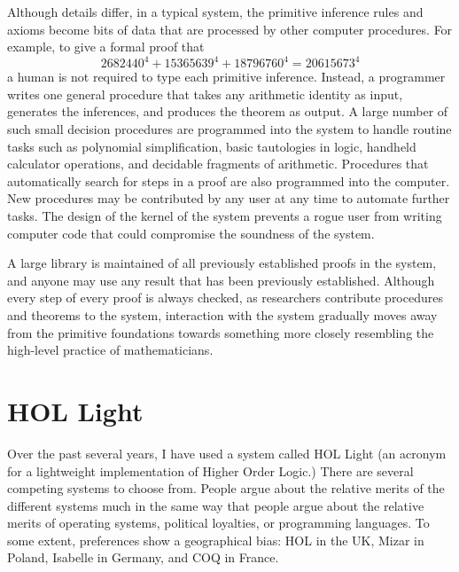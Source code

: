 \documentclass{llncs}
\begin{document}
Although details differ, 
in a typical system, the primitive inference rules and axioms
become bits of data that are processed by other computer procedures.
For example, to give a formal proof that 
$$
2682440^4 + 15365639^4 + 18796760^4 = 20615673^4
$$
a human is not required to type each primitive inference.  Instead,
a programmer writes one general procedure that takes any arithmetic
identity as input,  generates the inferences,
and produces the theorem as output.   A large number of such
small decision procedures are programmed into the system to handle
routine tasks such as polynomial simplification, basic tautologies in logic,
handheld calculator operations, 
and decidable fragments of arithmetic.  
Procedures that automatically search for steps in a proof
are also programmed into the computer.  
New procedures may be contributed
by any user at any time to automate further tasks.
The design of the kernel of the system prevents a rogue
user from writing computer code that could compromise the soundness of the system.%


A large library is maintained
of all previously established proofs in the system, and anyone may
use any result that has been previously established.
 Although every step of every proof is
always checked,
as researchers contribute procedures and theorems to the system,
interaction with the system gradually moves
away from the primitive foundations towards something more closely
resembling the high-level practice of mathematicians.


%





\section{HOL Light}

Over the past several years, I have used a system called HOL Light  
(an acronym for a lightweight implementation of Higher Order Logic.)  There are several competing systems to choose from. %
People argue about the relative merits of the
different systems much in the same way that people argue about the relative merits
of operating systems, political loyalties, or programming languages.  To some extent, preferences
show a geographical bias:  HOL in the UK, Mizar in Poland, Isabelle in Germany, and
COQ in France.
\end{document}
